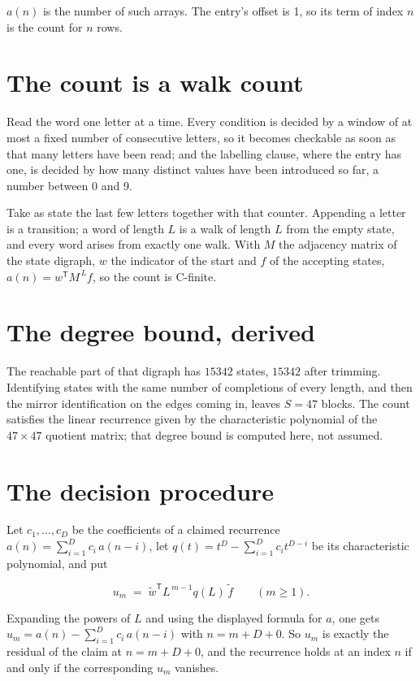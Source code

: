 \documentclass[11pt]{article}
\theoremstyle{definition}
\begin{document}
$a(n)$ is the number of such arrays. The entry's offset is 1, so its term of index $n$ is the count for $n$ rows.

\section{The count is a walk count}

Read the word one letter at a time. Every condition is decided by a window of at most a fixed number of consecutive letters, so it becomes checkable as soon as that many letters have been read; and the labelling clause, where the entry has one, is decided by how many distinct values have been introduced so far, a number between $0$ and 9.

Take as state the last few letters together with that counter. Appending a letter is a transition; a word of length $L$ is a walk of length $L$ from the empty state, and every word arises from exactly one walk. With $M$ the adjacency matrix of the state digraph, $w$ the indicator of the start and $f$ of the accepting states, $a(n) = w^{\mathsf T}M^{\,L}f$, so the count is C-finite.

\section{The degree bound, derived}

The reachable part of that digraph has $15342$ states, $15342$ after trimming. Identifying states with the same number of completions of every length, and then the mirror identification on the edges coming in, leaves $S = 47$ blocks. The count satisfies the linear recurrence given by the characteristic polynomial of the $47\times47$ quotient matrix; that degree bound is computed here, not assumed.

\section{The decision procedure}

Let $c_1,\dots,c_D$ be the coefficients of a claimed recurrence $a(n) = \sum_{i=1}^{D} c_i\,a(n-i)$, let $q(t) = t^{D} - \sum_{i=1}^{D} c_i t^{D-i}$ be its characteristic polynomial, and put

\[u_m \;=\; \tilde w^{\mathsf T} L^{\,m-1} q(L)\,\tilde f \qquad (m \ge 1).\]

Expanding the powers of $L$ and using the displayed formula for $a$, one gets $u_m = a(n) - \sum_{i=1}^{D} c_i\,a(n-i)$ with $n = m + D + 0$. So $u_m$ is exactly the residual of the claim at $n = m + D + 0$, and the recurrence holds at an index $n$ if and only if the corresponding $u_m$ vanishes.
\end{document}
